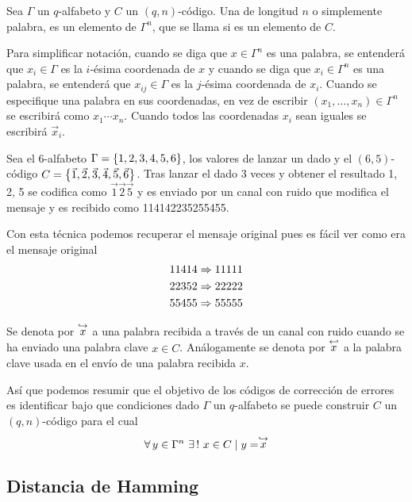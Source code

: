 \begin{definition}
	Sea $\Gamma$ un $q$-alfabeto y $C$ un $(q, n)$-código.
	Una  de longitud $n$ o simplemente palabra, es un elemento de $\Gamma^n$, que se llama  si es un elemento de $C$.
\end{definition}

Para simplificar notación, cuando se diga que $x\in\Gamma^n$ es una palabra, se entenderá que $x_i\in\Gamma$ es la $i$-ésima coordenada de $x$ y cuando se diga que $x_i\in\Gamma^n$ es una palabra, se entenderá que $x_{ij}\in\Gamma$ es la $j$-ésima coordenada de $x_i$.
Cuando se especifique una palabra en sus coordenadas, en vez de escribir $(x_1,\dots,x_n)\in\Gamma^n$ se escribirá como $x_1\cdots x_n$.
Cuando todos las coordenadas $x_i$ sean iguales se escribirá $\vec{x}_i$.

\begin{example}
	Sea el $6$-alfabeto $\Gamma=\left\{1, 2, 3, 4, 5, 6\right\}$, los valores de lanzar un dado
	y el $(6, 5)$-código $C=\left\{\vec{1}, \vec{2}, \vec{3}, \vec{4}, \vec{5}, \vec{6}\right\}$.
	Tras lanzar el dado 3 veces y obtener el resultado 1, 2, 5 se codifica como $\vec{1}\vec{2}\vec{5}$ y es enviado por un canal con ruido que modifica el mensaje y es recibido como 114142235255455.

	Con esta técnica podemos recuperar el mensaje original pues es fácil ver como era el mensaje original
	\begin{align*}
		11414 & \Rightarrow 11111 \\
		22352 & \Rightarrow 22222 \\
		55455 & \Rightarrow 55555
	\end{align*}
\end{example}

Se denota por $\stackrel{\hookrightarrow}{x}$ a una palabra recibida a través de un canal con ruido cuando se ha enviado una palabra clave $x\in C$.
Análogamente se denota por $\stackrel{\hookleftarrow}{x}$ a la palabra clave usada en el envío de una palabra recibida $x$.

Así que podemos resumir que el objetivo de los códigos de corrección de errores es identificar bajo que condiciones dado $\Gamma$ un $q$-alfabeto se puede construir $C$ un $(q, n)$-código para el cual
\[
	\forall y\in\Gamma^n\ \exists!\ x\in C \tq y = \push{x}
\]

\subsection{Distancia de Hamming}

